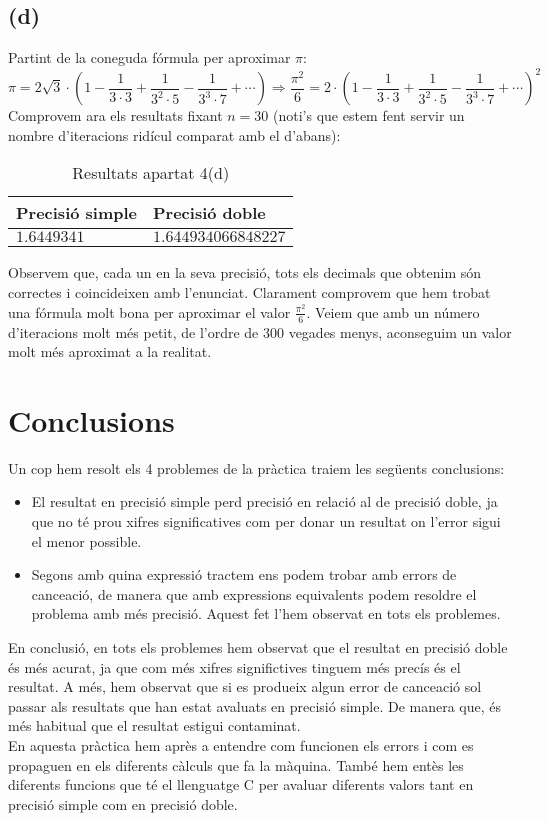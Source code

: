 \documentclass[a4paper,10pt]{article}
\begin{document}
  \subsection*{(d)}
  Partint de la coneguda fórmula per aproximar $\pi$:
  \begin{equation*}
    \pi = 2 \sqrt{3} \cdot \left( 1 - \frac{1}{3 \cdot 3} + \frac{1}{3^2 \cdot 5} - \frac{1}{3^3 \cdot 7} + \dotsi \right)
    \Longrightarrow
    \frac{\pi^2}{6} = 2 \cdot \left( 1 - \frac{1}{3 \cdot 3} + \frac{1}{3^2 \cdot 5} - \frac{1}{3^3 \cdot 7} + \dotsi \right)^2
  \end{equation*}
  Comprovem ara els resultats fixant $n = 30$ (noti's que estem fent servir un nombre d'iteracions ridícul comparat amb el d'abans):
  \begin{table}[H]
    \begin{center}
      \begin{tabular}[c]{|p{30mm}|p{30 mm}|}
      \hline 
      Precisió simple & Precisió doble \\
      \hline 
      $1.6449341$
      &
      $1.644934066848227$ \\
      \hline
      \end{tabular}
    \caption{Resultats apartat 4(d)}
    \end{center}
  \end{table}
  Observem que, cada un en la seva precisió, tots els decimals que obtenim són correctes i coincideixen amb l'enunciat. Clarament comprovem que hem trobat una fórmula molt bona per aproximar el valor $\frac{\pi^2}{6}$. Veiem que amb un número d'iteracions molt més petit, de l'ordre de 300 vegades menys, aconseguim un valor molt més aproximat a la realitat.
  \newpage
\section*{Conclusions}
  Un cop hem resolt els 4 problemes de la pràctica traiem les següents conclusions:
  \begin{itemize}
    \item El resultat en precisió simple perd precisió en relació al de precisió doble, ja que no té prou xifres significatives com per donar un resultat on l'error sigui el menor possible.
    \item Segons amb quina expressió tractem ens podem trobar amb errors de cance\lgem ació, de manera que amb expressions equivalents podem resoldre el problema amb més precisió. Aquest fet l'hem observat en tots els problemes.
  \end{itemize}
  En conclusió, en tots els problemes hem observat que el resultat en precisió doble és més acurat, ja que com més xifres significtives tinguem més precís és el resultat. A més, hem observat que si es produeix algun error de cance\lgem ació sol passar als resultats que han estat avaluats en precisió simple. De manera que, és més habitual que el resultat estigui contaminat.\\
  En aquesta pràctica hem après a entendre com funcionen els errors i com es propaguen en els diferents càlculs que fa la màquina. També hem entès les diferents funcions que té el llenguatge C per avaluar diferents valors tant en precisió simple com en precisió doble.
\end{document}
